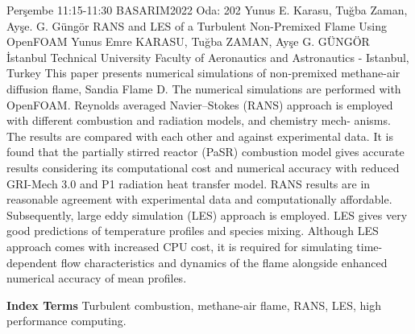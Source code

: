 
    \begin{abstract_basarim}
    {Perşembe 11:15-11:30}
    {BASARIM2022}
    {Oda: 202}
    {Yunus E. Karasu, Tuğba Zaman, Ayşe. G. Güngör}
    {RANS and LES of a Turbulent Non-Premixed Flame Using OpenFOAM}
    {%
    Yunus Emre KARASU, Tuğba ZAMAN, Ayşe G. GÜNGÖR}
    {%
    }
    {%
    İstanbul Technical University Faculty of Aeronautics and Astronautics - Istanbul, Turkey}
    This paper presents numerical simulations of non-premixed methane-air diffusion flame, Sandia Flame D. The numerical simulations are performed with OpenFOAM. Reynolds averaged Navier–Stokes (RANS) approach is employed with different combustion and radiation models, and chemistry mech- anisms. The results are compared with each other and against experimental data. It is found that the partially stirred reactor (PaSR) combustion model gives accurate results considering its computational cost and numerical accuracy with reduced GRI-Mech 3.0 and P1 radiation heat transfer model. RANS results are in reasonable agreement with experimental data and computationally affordable. Subsequently, large eddy simulation (LES) approach is employed. LES gives very good predictions of temperature profiles and species mixing. Although LES approach comes with increased CPU cost, it is required for simulating time-dependent flow characteristics and dynamics of the flame alongside enhanced numerical accuracy of mean profiles. 
    
            \textbf{Index Terms} \newline{}Turbulent combustion, methane-air flame, RANS, LES, high performance computing.
    \end{abstract_basarim}
    
